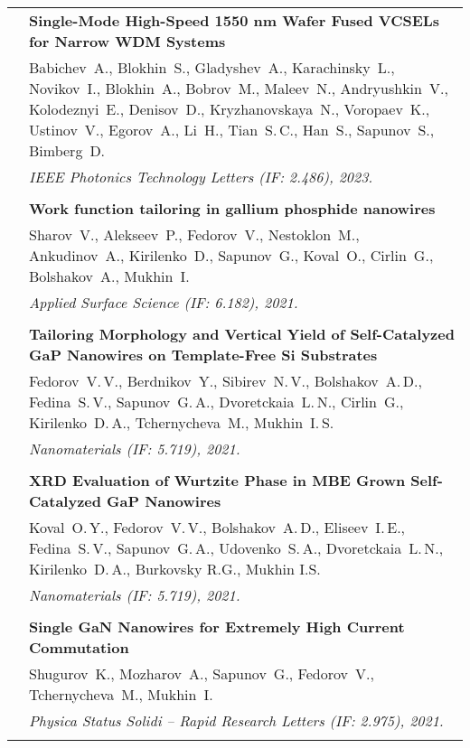 \documentclass[letterpaper, 11pt]{article}
\begin{document}
\begin{longtable}{p{1.3in}p{4.8in}}
		
		\nohyphens{\color{OliveGreen}{Q1 Publications}}
        & \textbf{Single-Mode High-Speed 1550 nm Wafer Fused VCSELs for Narrow
        WDM Systems} \\
        & Babichev~A., Blokhin~S., Gladyshev~A., Karachinsky~L., Novikov~I.,
        Blokhin~A., Bobrov~M., Maleev~N., Andryushkin~V., Kolodeznyi~E.,
        Denisov~D., Kryzhanovskaya~N., Voropaev~K., Ustinov~V., Egorov~A.,
        Li~H., Tian~S.\,C., Han~S., Sapunov~S., Bimberg~D.
        \\
        & \textit{IEEE Photonics Technology Letters (IF: 2.486), 2023.}\\
		& \\

        & \textbf{Work function tailoring in gallium phosphide nanowires} \\
        & Sharov~V., Alekseev~P., Fedorov~V., Nestoklon~M., Ankudinov~A.,
        Kirilenko~D., Sapunov~G., Koval~O., Cirlin~G., Bolshakov~A., Mukhin~I.
        \\
        & \textit{Applied Surface Science (IF: 6.182), 2021.}\\
		& \\

        & \textbf{Tailoring Morphology and Vertical Yield of Self-Catalyzed GaP
        Nanowires on Template-Free Si Substrates} \\
        & Fedorov~V.\,V., Berdnikov~Y., Sibirev~N.\,V., Bolshakov~A.\,D.,
        Fedina~S.\,V., Sapunov~G.\,A., Dvoretckaia~L.\,N., Cirlin~G.,
        Kirilenko~D.\,A., Tchernycheva~M., Mukhin~I.\,S. \\
		& \textit{Nanomaterials (IF: 5.719), 2021.}\\
		& \\

        & \textbf{XRD Evaluation of Wurtzite Phase in MBE Grown Self-Catalyzed
        GaP Nanowires} \\
        & Koval~O.\,Y., Fedorov~V.\,V., Bolshakov~A.\,D., Eliseev~I.\,E.,
        Fedina~S.\,V., Sapunov~G.\,A., Udovenko~S.\,A., Dvoretckaia~L.\,N.,
        Kirilenko~D.\,A., Burkovsky R.G., Mukhin I.S. \\
        & \textit{Nanomaterials (IF: 5.719), 2021.}\\
		& \\

        & \textbf{Single GaN Nanowires for Extremely High Current Commutation}
        \\
        & Shugurov~K., Mozharov~A., Sapunov~G., Fedorov~V., Tchernycheva~M.,
        Mukhin~I. \\
        & \textit{Physica Status Solidi -- Rapid Research Letters (IF: 2.975), 2021.}\\
		& \\


\end{longtable}
\end{document}
